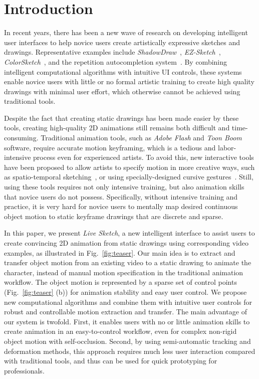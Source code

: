 \section{Introduction}

In recent years, there has been a new wave of research on developing intelligent user interfaces to help novice users create 
artistically expressive sketches and drawings.  Representative examples include \emph{ShadowDraw}~\cite{Lee:2011}, \emph{EZ-Sketch}~\cite{EZSketching:2014}, \emph{ColorSketch}~\cite{Li:2017}, and the repetition autocompletion system~\cite{Xing:2014}. By combining intelligent computational algorithms with intuitive UI controls, these systems enable novice users with little or no formal artistic training to create high quality drawings with minimal user effort, which otherwise cannot be achieved using traditional tools. 



Despite the fact that creating static drawings has been made easier by these tools, creating high-quality 2D animations still remains both difficult and time-consuming.
Traditional animation tools, such as \emph{Adobe Flash} and \emph{Toon Boom} software, require accurate motion keyframing, which is a tedious and labor-intensive process even for experienced artists.
To avoid this, new interactive tools have been proposed to allow artists to specify motion in more creative ways, such as spatio-temporal sketching~\cite{Guay:2015}, or using specially-designed cursive gestures~\cite{Thorne:2004}. Still, using these tools requires not only intensive training, but also  {animation skills} that novice users do not possess.  
Specifically, without intensive training and practice, it is very hard for novice users to mentally map desired continuous object motion to static keyframe drawings that are discrete and sparse.  


In this paper, we present {\em Live Sketch}, a new intelligent interface to assist users to create convincing 2D animation from static drawings using corresponding video examples, as illustrated in Fig.~\ref{fig:teaser}. 
Our main idea  is to extract and transfer object motion from an existing video to a static drawing to animate the character, instead of manual motion specification in the traditional animation workflow. 
The object motion is represented by a sparse set of control points (Fig.~\ref{fig:teaser} (b)) for animation stability and easy user control.
We propose new computational algorithms and combine them with intuitive user controls for robust and controllable motion extraction and transfer.
The main advantage of our system is twofold. First, it enables users with no or little animation 
skills to create animation in an easy-to-control workflow, even for complex non-rigid object motion with self-occlusion. Second, by using semi-automatic tracking and deformation methods, this approach requires much less user interaction compared with traditional tools, and thus can be used for quick prototyping for professionals. 

